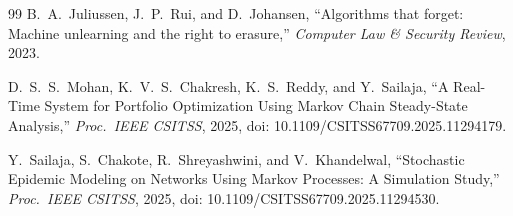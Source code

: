\documentclass[conference]{IEEEtran}
\begin{document}
\begin{thebibliography}{99}
B.~A.~Juliussen, J.~P.~Rui, and D.~Johansen,
``Algorithms that forget: Machine unlearning and the right to erasure,''
\textit{Computer Law \& Security Review}, 2023.

D.~S.~S.~Mohan, K.~V.~S.~Chakresh, K.~S.~Reddy, and Y.~Sailaja,
``A Real-Time System for Portfolio Optimization Using Markov Chain Steady-State Analysis,''
\textit{Proc.\ IEEE CSITSS}, 2025, doi: 10.1109/CSITSS67709.2025.11294179.

Y.~Sailaja, S.~Chakote, R.~Shreyashwini, and V.~Khandelwal,
``Stochastic Epidemic Modeling on Networks Using Markov Processes: A Simulation Study,''
\textit{Proc.\ IEEE CSITSS}, 2025, doi: 10.1109/CSITSS67709.2025.11294530.

\end{thebibliography}
\end{document}
